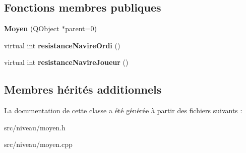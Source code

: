 \subsection*{Fonctions membres publiques}
\begin{DoxyCompactItemize}
\item 
{\bfseries Moyen} (Q\+Object $\ast$parent=0)\hypertarget{class_moyen_aecc34019bec885b6efa891eb00be0734}{}\label{class_moyen_aecc34019bec885b6efa891eb00be0734}

\item 
virtual int {\bfseries resistance\+Navire\+Ordi} ()\hypertarget{class_moyen_a684286278fba33c6274c95b441c1ae86}{}\label{class_moyen_a684286278fba33c6274c95b441c1ae86}

\item 
virtual int {\bfseries resistance\+Navire\+Joueur} ()\hypertarget{class_moyen_af382993bc71204e798501b1e3fe33aa2}{}\label{class_moyen_af382993bc71204e798501b1e3fe33aa2}

\end{DoxyCompactItemize}
\subsection*{Membres hérités additionnels}


La documentation de cette classe a été générée à partir des fichiers suivants \+:\begin{DoxyCompactItemize}
\item 
src/niveau/moyen.\+h\item 
src/niveau/moyen.\+cpp\end{DoxyCompactItemize}
